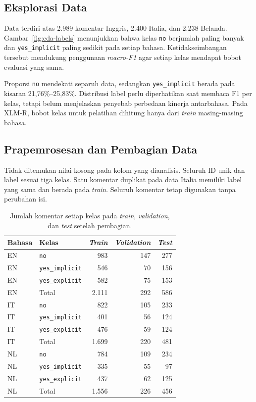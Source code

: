 \documentclass[11pt]{article}
\begin{document}
\subsection{Eksplorasi Data}

Data terdiri atas 2.989 komentar Inggris, 2.400 Italia, dan 2.238 Belanda. Gambar~\ref{fig:eda-labels} menunjukkan bahwa kelas \texttt{no} berjumlah paling banyak dan \texttt{yes\_implicit} paling sedikit pada setiap bahasa. Ketidakseimbangan tersebut mendukung penggunaan \textit{macro-F1} agar setiap kelas mendapat bobot evaluasi yang sama.

Proporsi \texttt{no} mendekati separuh data, sedangkan \texttt{yes\_implicit} berada pada kisaran 21,76\%--25,83\%. Distribusi label perlu diperhatikan saat membaca F1 per kelas, tetapi belum menjelaskan penyebab perbedaan kinerja antarbahasa.
Pada XLM-R, bobot kelas untuk pelatihan dihitung hanya dari \textit{train} masing-masing bahasa.

\subsection{Prapemrosesan dan Pembagian Data}

Tidak ditemukan nilai kosong pada kolom yang dianalisis. Seluruh ID unik dan label sesuai tiga kelas. Satu komentar duplikat pada data Italia memiliki label yang sama dan berada pada \textit{train}. Seluruh komentar tetap digunakan tanpa perubahan isi.

\begin{table}[t]

\centering
\small
\setlength{\tabcolsep}{3pt}
\begin{tabular}{llrrr}
\toprule
Bahasa & Kelas & \textit{Train} & \textit{Validation} & \textit{Test} \\
\midrule
EN & \texttt{no} & 983 & 147 & 277 \\
EN & \texttt{yes\_implicit} & 546 & 70 & 156 \\
EN & \texttt{yes\_explicit} & 582 & 75 & 153 \\
EN & Total & 2.111 & 292 & 586 \\
\midrule
IT & \texttt{no} & 822 & 105 & 233 \\
IT & \texttt{yes\_implicit} & 401 & 56 & 124 \\
IT & \texttt{yes\_explicit} & 476 & 59 & 124 \\
IT & Total & 1.699 & 220 & 481 \\
\midrule
NL & \texttt{no} & 784 & 109 & 234 \\
NL & \texttt{yes\_implicit} & 335 & 55 & 97 \\
NL & \texttt{yes\_explicit} & 437 & 62 & 125 \\
NL & Total & 1.556 & 226 & 456 \\
\bottomrule
\end{tabular}
\caption{Jumlah komentar setiap kelas pada \textit{train}, \textit{validation}, dan \textit{test} setelah pembagian.}
\label{tab:split}
\end{table}
\end{document}
